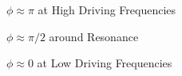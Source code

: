 \begin{figure}[h]
	\caption{$\phi\approx\pi$ at High Driving Frequencies}
\end{figure}
\begin{figure}[h]
	\caption{$\phi\approx\pi/2$ around Resonance}
\end{figure}
\begin{figure}[h]
	\caption{$\phi\approx0$ at Low Driving Frequencies}
\end{figure}

